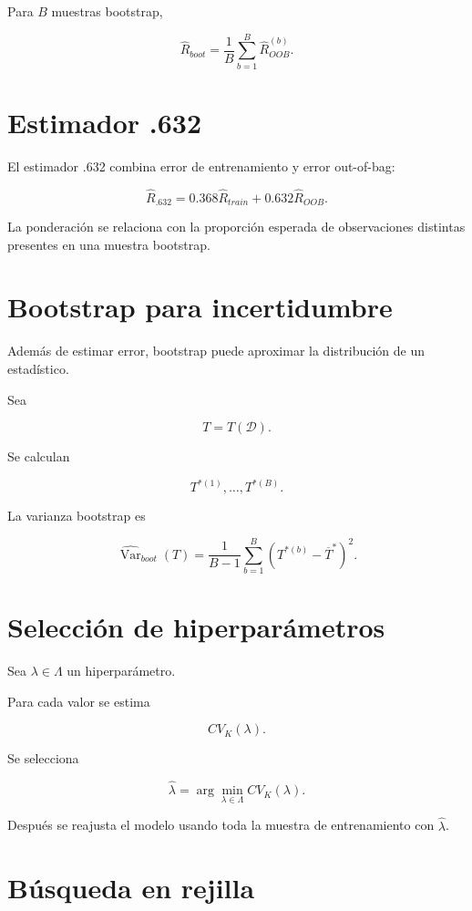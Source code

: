 \documentclass[
  spanish,
  11pt,
  letterpaper,
  DIV=11,
  numbers=noendperiod]{scrreprt}
\theoremstyle{definition}
\theoremstyle{plain}
\theoremstyle{definition}
\theoremstyle{remark}
\begin{document}
Para \(B\) muestras bootstrap,

\[
\widehat{R}_{boot}
=
\frac{1}{B}
\sum_{b=1}^{B}
\widehat{R}_{OOB}^{(b)}.
\]

\section{Estimador .632}\label{estimador-.632}

El estimador .632 combina error de entrenamiento y error out-of-bag:

\[
\widehat{R}_{.632}
=
0.368
\widehat{R}_{train}
+
0.632
\widehat{R}_{OOB}.
\]

La ponderación se relaciona con la proporción esperada de observaciones
distintas presentes en una muestra bootstrap.

\section{Bootstrap para
incertidumbre}\label{bootstrap-para-incertidumbre}

Además de estimar error, bootstrap puede aproximar la distribución de un
estadístico.

Sea

\[
T=T(\mathcal{D}).
\]

Se calculan

\[
T^{*(1)},\ldots,T^{*(B)}.
\]

La varianza bootstrap es

\[
\widehat{\operatorname{Var}}_{boot}(T)
=
\frac{1}{B-1}
\sum_{b=1}^{B}
\left(
T^{*(b)}
-
\overline{T}^{*}
\right)^2.
\]

\section{Selección de
hiperparámetros}\label{selecciuxf3n-de-hiperparuxe1metros}

Sea \(\lambda\in\Lambda\) un hiperparámetro.

Para cada valor se estima

\[
CV_K(\lambda).
\]

Se selecciona

\[
\widehat{\lambda}
=
\arg\min_{\lambda\in\Lambda}
CV_K(\lambda).
\]

Después se reajusta el modelo usando toda la muestra de entrenamiento
con \(\widehat{\lambda}\).

\section{Búsqueda en rejilla}\label{buxfasqueda-en-rejilla}
\end{document}
